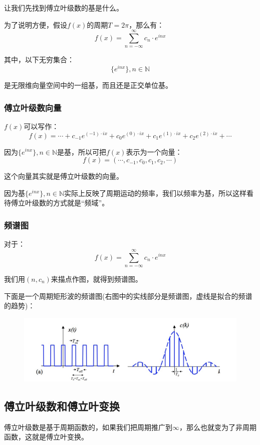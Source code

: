 \documentclass[12pt]{article}
\begin{document}
让我们先找到傅立叶级数的基是什么。

为了说明方便，假设$f(x)$的周期$T=2\pi$，那么有：
$$
f(x)=\sum _{n=-\infty}^{\infty}c_{n}\cdot e^{inx}
$$

其中，以下无穷集合：
$$
\{e^{inx}\},n\in\mathbb{N}
$$

是无限维向量空间中的一组基，而且还是正交单位基。

\subsubsection{傅立叶级数向量}
$f(x)$可以写作：
$$
f(x)=\cdots+c_{-1}e^{(-1)\cdot ix}+c_{0}e^{(0)\cdot ix}+c_{1}e^{(1)\cdot ix}+c_{2}e^{(2)\cdot ix}+\cdots
$$

因为$\{e^{inx}\},n\in\mathbb{N}$是基，所以可把$f(x)$表示为一个向量：
$$
f(x)=(\cdots, c_{-1}, c_0, c_1, c_2, \cdots)
$$

这个向量其实就是傅立叶级数的向量。

因为基$\{e^{inx}\},n\in\mathbb{N}$实际上反映了周期运动的频率，我们以频率为基，所以这样看待傅立叶级数的方式就是“频域”。

\subsubsection{频谱图}
对于：
$$
f(x)=\sum _{n=-\infty}^{\infty}c_{n}\cdot e^{inx}
$$

我们用$(n,c_n)$来描点作图，就得到频谱图。

下面是一个周期矩形波的频谱图(右图中的实线部分是频谱图，虚线是拟合的频谱的趋势)：
\begin{figure}[H]
  \centering
  \includegraphics[width=.8\textwidth]{fig/square_wave.png}
\end{figure}

\subsection{傅立叶级数和傅立叶变换}
傅立叶级数是基于周期函数的，如果我们把周期推广到$\infty$，那么也就变为了非周期函数，这就是傅立叶变换。
\end{document}
